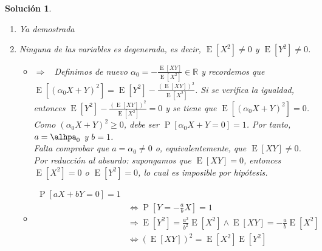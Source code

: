 \documentclass[
  a4paper,
  spanish,
  12pt,
]{scrartcl}
\theoremstyle{ejercicio-style}
\theoremstyle{remark-style}
\newtheorem*{sol}{Solución}
\begin{document}
\begin{sol}
\begin{enumerate}
\begin{itemize}
  	  \end{itemize}
  	
  	\item Ya demostrada
  	
  	\item Ninguna de las variables es degenerada, es decir, \(\operatorname{E}[X^2] \neq 0\) y \(\operatorname{E}[Y^2] \neq 0\).
  	\begin{itemize}
  	  \item \(\Rightarrow\) \ Definimos de nuevo \(\alpha_0 = -\frac{\operatorname{E}[XY]}{\operatorname{E}[X^2]} \in \mathbb{R}\) y recordemos que \(\operatorname{E}[(\alpha_0 X + Y)^2] = \operatorname{E}[Y^2] - \frac{(\operatorname{E}[XY])^2}{\operatorname{E}[X^2]}\). Si se verifica la igualdad, entonces \(\operatorname{E}[Y^2] - \frac{(\operatorname{E}[XY])^2}{\operatorname{E}[X^2]} = 0\) y se tiene que \(\operatorname{E}[(\alpha_0 X + Y)^2] = 0\). Como \((\alpha_0 X + Y)^2 \geq 0\), debe ser \(\operatorname{P}[\alpha_0 X + Y = 0] = 1\). Por tanto, \(a = \alhpa_0\) y \(b=1\). \\
  	  Falta comprobar que \(a = \alpha_0 \neq 0\) o, equivalentemente, que \(\operatorname{E}[XY] \neq 0\). Por reducción al absurdo: supongamos que \(\operatorname{E}[XY] = 0\), entonces \(\operatorname{E}[X^2] = 0\) o \(\operatorname{E}[Y^2] = 0\), lo cual es imposible por hipótesis.
  	  
  	  
  	  \item \Leftarrow
  	  \begin{align*}
  	     \operatorname{P}[aX + bY = 0] = 1 \\
  	     &\Leftrightarrow \operatorname{P}[Y = -\frac{a}{b}X] = 1 \\
  	     &\Rightarrow \operatorname{E}[Y^2] = \frac{a^2}{b^2}\operatorname{E}[X^2] \wedge \operatorname{E}[XY] = -\frac{a}{b}\operatorname{E}[X^2] \\
  	     &\Leftrightarrow (\operatorname{E}[XY])^2 = \operatorname{E}[X^2] \operatorname{E}[Y^2] \\
  	  \end{align*}
  	\end{itemize}
  	
  \end{enumerate}
\end{sol}
\end{document}
